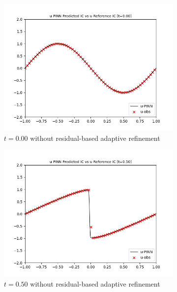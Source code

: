 \documentclass[letterpaper,11pt]{article}
\begin{document}
    \begin{figure}[h]
        \centering
        \begin{subfigure}{0.45\textwidth}
            \includegraphics*[width=\textwidth]{burgers_forward_t0.00.png}
            \caption{$t = 0.00$ without residual-based adaptive refinement}
        \end{subfigure}
        \hfill
        \begin{subfigure}{0.45\textwidth}
            \includegraphics*[width=\textwidth]{burgers_forward_t0.50.png}
            \caption{$t = 0.50$ without residual-based adaptive refinement}
        \end{subfigure}
        \begin{subfigure}{0.45\textwidth}

\end{subfigure}
\end{figure}
\end{document}
